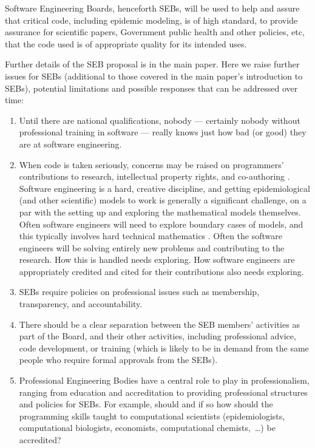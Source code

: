 \documentclass{article}
\begin{document}
Software Engineering Boards, henceforth SEBs, will be used to help and assure that critical code, including epidemic modeling, is of high standard, to provide assurance for scientific papers, Government public health and other policies, etc, that the code used is of appropriate quality for its intended uses.  

Further details of the SEB proposal is in the main paper. Here we raise further issues for SEBs (additional to those covered in the main paper's introduction to SEBs), potential limitations and possible responses that can be addressed over time:

\begin{enumerate}\raggedright
\item 
Until there are national qualifications, nobody --- certainly nobody without professional training in software --- really knows just how bad (or good) they are at software engineering.

\item
When code is taken seriously, concerns may be raised on programmers' contributions to research, intellectual property rights, and co-authoring \cite{vancouver}. Software engineering is a hard, creative discipline, and getting epidemiological (and other scientific) models to work is generally a significant challenge, on a par with the setting up and exploring the mathematical models themselves. Often software engineers will need to explore boundary cases of models, and this typically involves hard technical mathematics \cite{hamming}. Often the software engineers will be solving entirely new problems and contributing to the research. How this is handled needs exploring. How software engineers are appropriately credited and cited for their contributions also needs exploring.

\item 
SEBs require policies on professional issues such as membership, transparency, and accountability.
 
\item
There should be a clear separation between the SEB members' activities as part of the Board, and their other activities, including professional advice, code development, or training (which is likely to be in demand from the same people who require formal approvals from the SEBs).

\item
Professional Engineering Bodies have a central role to play in professionalism, ranging from education and accreditation to providing professional structures and policies for SEBs. For example, should and if so how should the programming skills taught to computational scientists (epidemiologists, computational biologists, economists, computational chemists,~\ldots\@) be accredited?


\end{enumerate}
\end{document}
